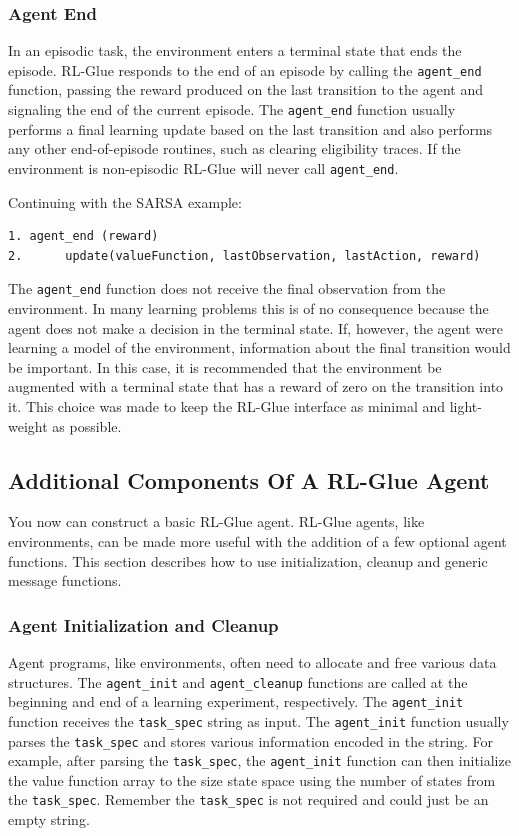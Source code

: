 \documentclass[11pt]{article}
\begin{document}
\subsubsection{Agent End}
In an episodic task, the environment enters a terminal state that ends the episode. RL-Glue responds to the end of an episode by calling the \texttt{agent\_end} function, passing the reward produced on the last transition to the agent and signaling the end of the current episode. The \texttt{agent\_end} function usually performs a final learning update based on the last transition and also performs any other end-of-episode routines, such as clearing eligibility traces. If the environment is non-episodic RL-Glue will never call \texttt{agent\_end}.

Continuing with the SARSA example:
\begin{verbatim}
1. agent_end (reward) 
2.      update(valueFunction, lastObservation, lastAction, reward)
\end{verbatim}


The \texttt{agent\_end} function does not receive the final observation from the environment. In many learning problems this is of no consequence because the agent does not make a decision in the terminal state. If, however, the agent were learning a model of the environment, information about the final transition would be important. In this case, it is recommended that the environment be augmented with a terminal state that has a reward of zero on the transition into it. This choice was made to keep the RL-Glue interface as minimal and light-weight as possible. 

\subsection{Additional Components Of A RL-Glue Agent}
\label{agentp2}
You now can construct a basic RL-Glue agent. RL-Glue agents, like environments, can be made more useful with the addition of a few optional agent functions. This section describes how to use initialization, cleanup and generic message functions.

\subsubsection{Agent Initialization and Cleanup}
Agent programs, like environments, often need to allocate and free various data structures. The \texttt{agent\_init}  and \texttt{agent\_cleanup} functions are called at the beginning and end of a learning experiment, respectively. The \texttt{agent\_init}  function receives the \texttt{task\_spec} string as input. The \texttt{agent\_init}  function usually parses the \texttt{task\_spec} and stores various information encoded in the string. For example, after parsing the \texttt{task\_spec}, the \texttt{agent\_init}  function can then initialize the value function array to the size state space using the number of states from the \texttt{task\_spec}. Remember the \texttt{task\_spec} is not required and could just be an empty string.      
\end{document}
